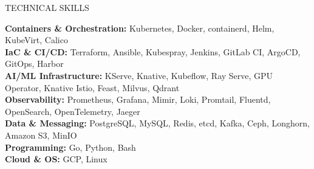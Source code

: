 \documentclass{resume}
\begin{document}

\begin{rSection}{TECHNICAL SKILLS}

\textbf{Containers \& Orchestration:} Kubernetes, Docker, containerd, Helm, KubeVirt, Calico \\
\textbf{IaC \& CI/CD:} Terraform, Ansible, Kubespray, Jenkins, GitLab CI, ArgoCD, GitOps, Harbor \\
\textbf{AI/ML Infrastructure:} KServe, Knative, Kubeflow, Ray Serve, GPU Operator, Knative Istio, Feast, Milvus, Qdrant \\
\textbf{Observability:} Prometheus, Grafana, Mimir, Loki, Promtail, Fluentd, OpenSearch, OpenTelemetry, Jaeger \\
\textbf{Data \& Messaging:} PostgreSQL, MySQL, Redis, etcd, Kafka, Ceph, Longhorn, Amazon S3, MinIO \\
\textbf{Programming:} Go, Python, Bash \\
\textbf{Cloud \& OS:} GCP, Linux

\end{rSection}

\end{document}
